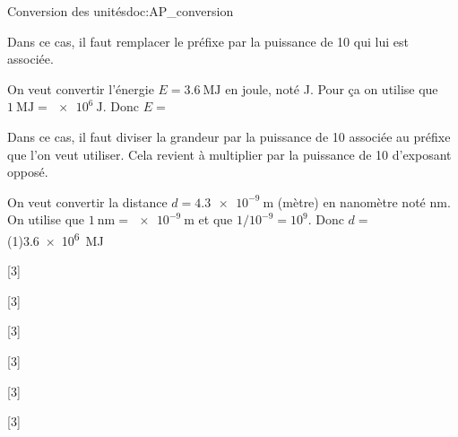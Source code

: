 \begin{doc}{Conversion des unités}{doc:AP_conversion}

  Dans ce cas, il faut remplacer le préfixe par la puissance de 10 qui lui est associée.
  
  \exemple On veut convertir l'énergie $E = \qty{3,6}{\mega\joule}$ en joule, noté \unit{\joule}.
  Pour ça on utilise que $\qty{1}{\mega\joule} = \qty{e6}{\joule}$.
  Donc $E =$ 

  \bigskip

  Dans ce cas, il faut diviser la grandeur par la puissance de 10 associée au préfixe que l'on veut utiliser.
  Cela revient à multiplier par la puissance de 10 d'exposant opposé.

  \exemple On veut convertir la distance $d = \qty{4,3e-9}{\m}$ (mètre) en nanomètre noté \unit{nm}.
  On utilise que $\qty{1}{\nano\m} = \qty{e-9}{\m}$ et que $1 / 10^{-9} = 10^9$. 
  Donc $d = $ \texteTrou(1){\qty{3,6e6}{\mega\joule}}
\end{doc}

[3]

[3]

[3]

[3]

[3]

[3]